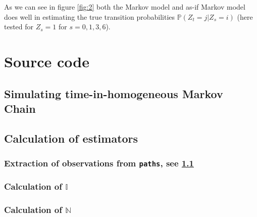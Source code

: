 \documentclass[12pt,letter,twoside]{article}
\theoremstyle{plain}
\theoremstyle{definition}
\theoremstyle{remark}
\begin{document}
As we can see in figure \ref{fig:2} both the Markov model and as-if Markov model does well in estimating the true transition probabilities $\mathbb P(Z_t=j\vert Z_s=i)$ (here tested for $Z_s=1$ for $s=0,1,3,6$). 


\printbibliography
\newpage

\appendix
\section{Source code}\vspace{-85pt}
\subsection{Simulating time-in-homogeneous Markov Chain}\label{appendix:A1}\vspace{-80pt}

\pagebreak

\subsection{Calculation of estimators}\label{appendix:A2}\vspace{15pt}
\subsubsection{Extraction of observations from \texttt{paths}, see \ref{appendix:A1}}\label{appendix:A2.1}\vspace{10pt}


\subsubsection{Calculation of $\mathbb I$}\label{appendix:A2.2}\vspace{10pt}


\subsubsection{Calculation of $\mathbb N$}\label{appendix:A2.3}\vspace{10pt}

\end{document}
